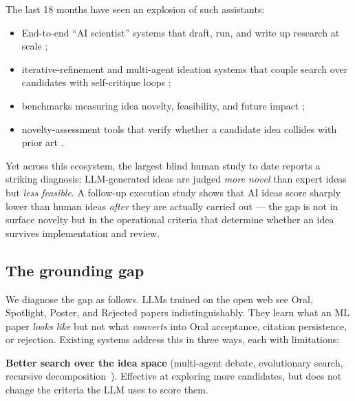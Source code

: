 \documentclass[10pt,a4paper]{article}
\begin{document}
The last 18 months have seen an explosion of such assistants:
\begin{itemize}[leftmargin=1.5em, topsep=2pt, itemsep=2pt]
\item End-to-end ``AI scientist'' systems that draft, run, and write up research at scale \cite{lu2024aiscientist,airesearcher2025,agentlab2025};
\item iterative-refinement and multi-agent ideation systems that couple search over candidates with self-critique loops \cite{baek2024researchagent,deepideation2025,virsci2024,iris2025,multiworkflow2026,idea2plan2025};
\item benchmarks measuring idea novelty, feasibility, and future impact \cite{ideabench2024,airesearchideas2025,researchbench2025,hindsight2026,future_aligned2026};
\item novelty-assessment tools that verify whether a candidate idea collides with prior art \cite{novbench2026,opennovelty2026,graphmind2025,litgrounded2025,idea_novelty_checker2025,augment_ideation2026}.
\end{itemize}

Yet across this ecosystem, the largest blind human study to date \cite{si2024llmideas} reports a striking diagnosis: LLM-generated ideas are judged \emph{more novel} than expert ideas but \emph{less feasible}. A follow-up execution study \cite{si2026execution} shows that AI ideas score sharply lower than human ideas \emph{after} they are actually carried out --- the gap is not in surface novelty but in the operational criteria that determine whether an idea survives implementation and review.

\subsection{The grounding gap}

We diagnose the gap as follows. LLMs trained on the open web see Oral, Spotlight, Poster, and Rejected papers indistinguishably. They learn what an ML paper \emph{looks like} but not what \emph{converts} into Oral acceptance, citation persistence, or rejection. Existing systems address this in three ways, each with limitations:

\textbf{Better search over the idea space} (multi-agent debate, evolutionary search, recursive decomposition~\cite{virsci2024,deepideation2025,multiworkflow2026,iris2025,sakana_v2}). Effective at exploring more candidates, but does not change the criteria the LLM uses to score them.
\end{document}
